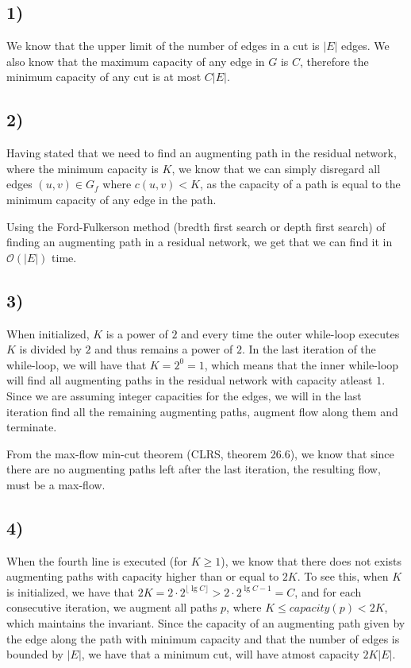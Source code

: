 \documentclass[a4paper]{article}
\begin{document}
\subsection*{1)}
We know that the upper limit of the number of edges in a cut is $|E|$ edges. We also know that the maximum capacity of any edge in $G$ is $C$, therefore the minimum capacity of any cut is at most $C|E|$.
\subsection*{2)}
Having stated that we need to find an augmenting path in the residual network, where the minimum capacity is $K$, we know that we can simply disregard all edges $(u,v)\in G_f$ where $c(u,v)<K$, as the capacity of a path is equal to the minimum capacity of any edge in the path.

Using the Ford-Fulkerson method (bredth first search or depth first search) of finding an augmenting path in a residual network, we get that we can find it in $\mathcal{O}(|E|)$ time.
\subsection*{3)}
When initialized, $K$ is a power of $2$ and every time the outer while-loop executes $K$ is divided by $2$ and thus remains a power of $2$. In the last iteration of the while-loop, we will have that $K=2^0=1$, which means that the inner while-loop will find all augmenting paths in the residual network with capacity atleast $1$. Since we are assuming integer capacities for the edges, we will in the last iteration find all the remaining augmenting paths, augment flow along them and terminate.

From the max-flow min-cut theorem (CLRS, theorem 26.6), we know that since there are no augmenting paths left after the last iteration, the resulting flow, must be a max-flow.
\subsection*{4)}
When the fourth line is executed (for $K\geq 1$), we know that there does not exists augmenting paths with capacity higher than or equal to $2K$. To see this, when $K$ is initialized, we have that $2K= 2\cdot 2^{\lfloor \lg C \rfloor} > 2\cdot 2^{\lg C -1} = C$, and for each consecutive iteration, we augment all paths $p$, where $K\leq capacity(p)<2K$, which maintains the invariant. Since the capacity of an augmenting path given by the edge along the path with minimum capacity and that
the number of edges is bounded by $|E|$, we have that a minimum cut, will have atmost capacity $2K|E|$.
\end{document}
